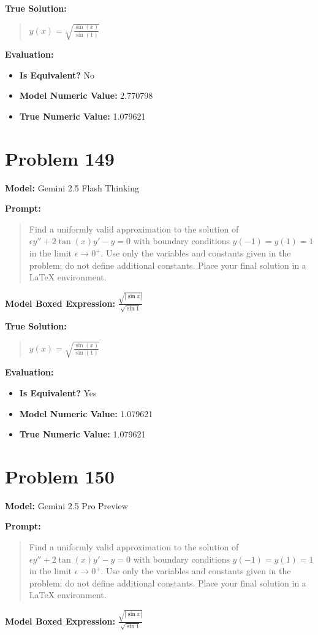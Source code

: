 \documentclass{article}
\begin{document}
{\textbf{True Solution:}
\begin{quote}
$y(x) = \sqrt{\frac{\sin(x)}{\sin(1)}}$
\end{quote}

\textbf{Evaluation:}
\begin{itemize}
\item \textbf{Is Equivalent?} No
\item \textbf{Model Numeric Value:} 2.770798
\item \textbf{True Numeric Value:} 1.079621
\end{itemize}
\vspace{1cm}
\section*{Problem 149}
\textbf{Model:} Gemini 2.5 Flash Thinking

\textbf{Prompt:}
\begin{quote}
Find a uniformly valid approximation to the solution of $\epsilon y'' + 2 \tan(x) y' - y = 0$ with boundary conditions $y(-1) = y(1) = 1$ in the limit $\epsilon \to 0^+$. Use only the variables and constants given in the problem; do not define additional constants. Place your final solution in a $\boxed{}$ LaTeX environment.
\end{quote}
\textbf{Model Boxed Expression:} $\frac{\sqrt{|\sin x|}}{\sqrt{\sin 1}}$

\textbf{True Solution:}
\begin{quote}
$y(x) = \sqrt{\frac{\sin(x)}{\sin(1)}}$
\end{quote}

\textbf{Evaluation:}
\begin{itemize}
\item \textbf{Is Equivalent?} Yes
\item \textbf{Model Numeric Value:} 1.079621
\item \textbf{True Numeric Value:} 1.079621
\end{itemize}
\vspace{1cm}
\section*{Problem 150}
\textbf{Model:} Gemini 2.5 Pro Preview

\textbf{Prompt:}
\begin{quote}
Find a uniformly valid approximation to the solution of $\epsilon y'' + 2 \tan(x) y' - y = 0$ with boundary conditions $y(-1) = y(1) = 1$ in the limit $\epsilon \to 0^+$. Use only the variables and constants given in the problem; do not define additional constants. Place your final solution in a $\boxed{}$ LaTeX environment.
\end{quote}
\textbf{Model Boxed Expression:} $\frac{\sqrt{|\sin x|}}{\sqrt{\sin 1}}$

}
\end{document}
